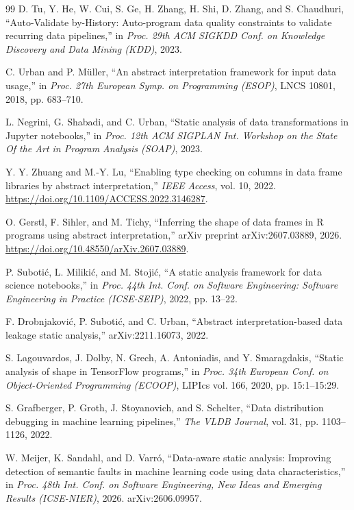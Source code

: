 \begin{thebibliography}{99}
D. Tu, Y. He, W. Cui, S. Ge, H. Zhang, H. Shi, D. Zhang, and S. Chaudhuri, ``Auto-Validate
by-History: Auto-program data quality constraints to validate recurring data pipelines,'' in
\emph{Proc. 29th ACM SIGKDD Conf. on Knowledge Discovery and Data Mining (KDD)}, 2023.

C. Urban and P. M\"uller, ``An abstract interpretation framework for input data usage,'' in
\emph{Proc. 27th European Symp. on Programming (ESOP)}, LNCS 10801, 2018, pp. 683--710.

L. Negrini, G. Shabadi, and C. Urban, ``Static analysis of data transformations in Jupyter
notebooks,'' in \emph{Proc. 12th ACM SIGPLAN Int. Workshop on the State Of the Art in Program
Analysis (SOAP)}, 2023.

Y. Y. Zhuang and M.-Y. Lu, ``Enabling type checking on columns in data frame libraries by abstract
interpretation,'' \emph{IEEE Access}, vol. 10, 2022. \url{https://doi.org/10.1109/ACCESS.2022.3146287}.

O. Gerstl, F. Sihler, and M. Tichy, ``Inferring the shape of data frames in R programs using
abstract interpretation,'' arXiv preprint arXiv:2607.03889, 2026.
\url{https://doi.org/10.48550/arXiv.2607.03889}.

P. Suboti\'{c}, L. Miliki\'{c}, and M. Stoji\'{c}, ``A static analysis framework for data science
notebooks,'' in \emph{Proc. 44th Int. Conf. on Software Engineering: Software Engineering in
Practice (ICSE-SEIP)}, 2022, pp. 13--22.

F. Drobnjakovi\'c, P. Suboti\'c, and C. Urban, ``Abstract interpretation-based data leakage static
analysis,'' arXiv:2211.16073, 2022.

S. Lagouvardos, J. Dolby, N. Grech, A. Antoniadis, and Y. Smaragdakis, ``Static analysis of shape in
TensorFlow programs,'' in \emph{Proc. 34th European Conf. on Object-Oriented Programming (ECOOP)},
LIPIcs vol. 166, 2020, pp. 15:1--15:29.

S. Grafberger, P. Groth, J. Stoyanovich, and S. Schelter, ``Data distribution debugging in machine
learning pipelines,'' \emph{The VLDB Journal}, vol. 31, pp. 1103--1126, 2022.

W. Meijer, K. Sandahl, and D. Varr\'o, ``Data-aware static analysis: Improving detection of semantic
faults in machine learning code using data characteristics,'' in \emph{Proc. 48th Int. Conf. on
Software Engineering, New Ideas and Emerging Results (ICSE-NIER)}, 2026. arXiv:2606.09957.


\end{thebibliography}
